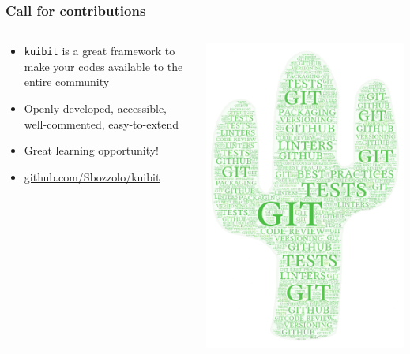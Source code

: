 \documentclass[compress, aspectratio=169]{beamer}
\begin{document}
\begin{frame}
  \frametitle{Call for contributions}
  \begin{columns}
    \begin{column}{0.7\linewidth}
      \begin{itemize}
        \item \texttt{kuibit} is a great framework to make your codes available
              to the entire community
        \item Openly developed, accessible, well-commented, easy-to-extend
        \item Great learning opportunity!
        \item \url{github.com/Sbozzolo/kuibit}
      \end{itemize}
    \end{column}
    \begin{column}{0.3\linewidth}
      \includegraphics[width=\linewidth]{kuibit_learning}
    \end{column}
  \end{columns}
\end{frame}
\end{document}
